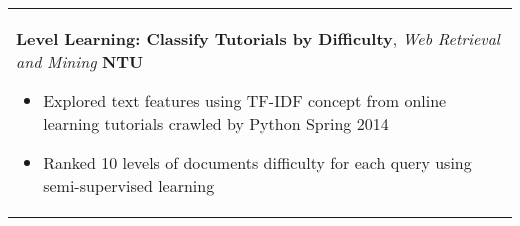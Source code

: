 \documentclass[a4paper,11pt]{article} %
\begin{document}
{\begin{tabular}{p{18.5cm}}
{\bf{Level Learning: Classify Tutorials by Difficulty}}, {\it{Web Retrieval and Mining}} \hfill {\bf{NTU}}
\begin{itemize}
\item Explored text features using TF-IDF concept from online learning tutorials crawled by Python \hfill Spring 2014
\item Ranked 10 levels of documents difficulty for each query using semi-supervised learning\vspace*{-\baselineskip}
\end{itemize}\\
%
%
%
%
\end{tabular}

}
\end{document}
